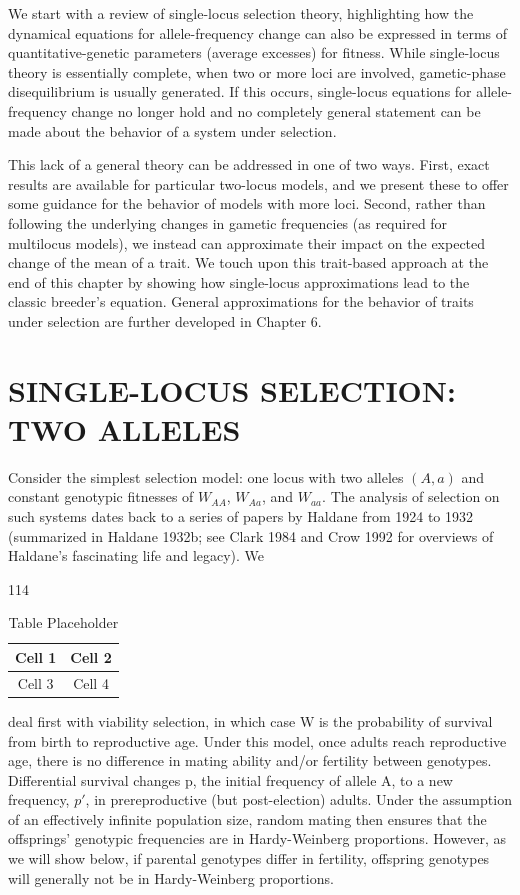 \documentclass{article}
\begin{document}
We start with a review of single-locus selection theory, highlighting how the dynamical equations for allele-frequency change can also be expressed in terms of quantitative-genetic parameters (average excesses) for fitness. While single-locus theory is essentially complete, when two or more loci are involved, gametic-phase disequilibrium is usually generated. If this occurs, single-locus equations for allele-frequency change no longer hold and no completely general statement can be made about the behavior of a system under selection.

This lack of a general theory can be addressed in one of two ways. First, exact results are available for particular two-locus models, and we present these to offer some guidance for the behavior of models with more loci. Second, rather than following the underlying changes in gametic frequencies (as required for multilocus models), we instead can approximate their impact on the expected change of the mean of a trait. We touch upon this trait-based approach at the end of this chapter by showing how single-locus approximations lead to the classic breeder's equation. General approximations for the behavior of traits under selection are further developed in Chapter 6.

\section{SINGLE-LOCUS SELECTION: TWO ALLELES}
Consider the simplest selection model: one locus with two alleles  $ (A, a) $ and constant genotypic fitnesses of  $ W_{AA} $,  $ W_{Aa} $, and  $ W_{aa} $. The analysis of selection on such systems dates back to a series of papers by Haldane from 1924 to 1932 (summarized in Haldane 1932b; see Clark 1984 and Crow 1992 for overviews of Haldane's fascinating life and legacy). We

114

\begin{table}[h]
\centering
\begin{tabular}{|c|c|}
\hline
Cell 1 & Cell 2 \\
\hline
Cell 3 & Cell 4 \\
\hline
\end{tabular}
\caption{Table Placeholder}
\end{table}

deal first with viability selection, in which case W is the probability of survival from birth to reproductive age. Under this model, once adults reach reproductive age, there is no difference in mating ability and/or fertility between genotypes. Differential survival changes p, the initial frequency of allele A, to a new frequency,  $ p' $, in prereproductive (but post-election) adults. Under the assumption of an effectively infinite population size, random mating then ensures that the offsprings' genotypic frequencies are in Hardy-Weinberg proportions. However, as we will show below, if parental genotypes differ in fertility, offspring genotypes will generally not be in Hardy-Weinberg proportions.
\end{document}
